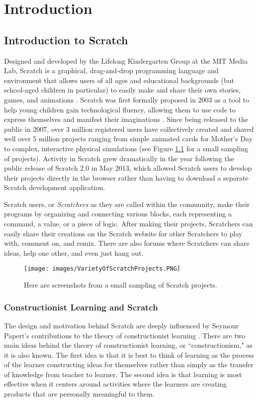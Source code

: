 \chapter{Introduction} 
\section{Introduction to Scratch}
Designed and developed by the Lifelong Kindergarten Group at the MIT Media Lab, Scratch is a graphical, drag-and-drop programming language and environment that allows users of all ages and educational backgrounds (but school-aged children in particular) to easily make and share their own stories, games, and animations \cite{ProgrammingForAll, Monroy-Hernandez}. Scratch was first formally proposed in 2003 as a tool to help young children gain technological fluency, allowing them to use code to express themselves and manifest their imaginations \cite{ScratchProposal}. Since being released to the public in 2007, over 3 million registered users have collectively created and shared well over 5 million projects \cite{ScratchStats} ranging from simple animated cards for Mother's Day to complex, interactive physical simulations (see Figure \ref{VarietyOfScratchProjects} for a small sampling of projects). Activity in Scratch grew dramatically in the year following the public release of Scratch 2.0 in May 2013, which allowed Scratch users to develop their projects directly in the browser rather than having to download a separate Scratch development application. 

Scratch users, or \emph{Scratchers} as they are called within the community, make their programs by organizing and connecting various blocks, each representing a command, a value, or a piece of logic. After making their projects, Scratchers can easily share their creations on the Scratch website for other Scratchers to play with, comment on, and remix. There are also forums where Scratchers can share ideas, help one other, and even just hang out.

\begin{figure}
\centering
\texttt{[image: images/VarietyOfScratchProjects.PNG]}
\caption[Screenshots from a Small Sampling of Scratch Projects]
{Here are screenshots from a small sampling of Scratch projects.}
\label{VarietyOfScratchProjects}
\end{figure}

\subsection{Constructionist Learning and Scratch}
The design and motivation behind Scratch are deeply influenced by Seymour Papert's contributions to the theory of constructionist learning \cite{Papert}. There are two main ideas behind the theory of constructionist learning, or ``constructionism," as it is also known. The first idea is that it is best to think of learning as the process of the learner constructing ideas for themselves rather than simply as the transfer of knowledge from teacher to learner. The second idea is that learning is most effective when it centers around activities where the learners are creating products that are personally meaningful to them.

